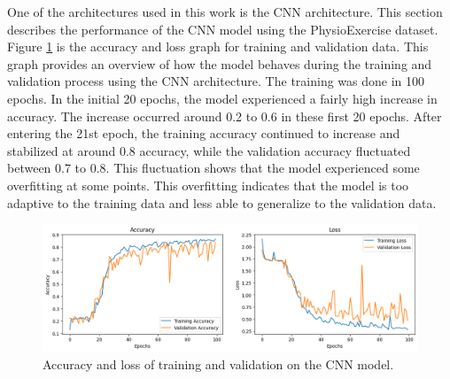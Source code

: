 One of the architectures used in this work is the CNN architecture. This section describes the performance of the CNN model using the PhysioExercise dataset. Figure \ref{fig:CNN_AccLoss} is the accuracy and loss graph for training and validation data. This graph provides an overview of how the model behaves during the training and validation process using the CNN architecture. The training was done in 100 epochs. In the initial 20 epochs, the model experienced a fairly high increase in accuracy. The increase occurred around 0.2 to 0.6 in these first 20 epochs. After entering the 21st epoch, the training accuracy continued to increase and stabilized at around 0.8 accuracy, while the validation accuracy fluctuated between 0.7 to 0.8. This fluctuation shows that the model experienced some overfitting at some points. This overfitting indicates that the model is too adaptive to the training data and less able to generalize to the validation data.

\begin{figure}[h!]
	\centering
	\includegraphics[width=1\textwidth]{bab4/ar_CNN_AccLoss.png}
	\caption{Accuracy and loss of training and validation on the CNN model.}
	\label{fig:CNN_AccLoss}
\end{figure}

